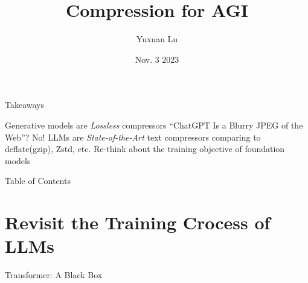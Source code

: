 \documentclass[scheme=plain]{ctexbeamer}
\title{Compression for AGI}
\author{Yuxuan Lu}
\institute{Northeastern Human-Centered AI Lab}
\date{Nov. 3 2023}
\begin{document}
\maketitle

\begin{frame}{Takeaways}
    \begin{outline}
        \1 Generative models are \emph{Lossless} compressors
            \2 ``ChatGPT Is a Blurry JPEG of the Web''? No!
        \1 LLMs are \emph{State-of-the-Art} text compressors
            \2 comparing to deflate(gzip), Zstd, etc.
        \1 Re-think about the training objective of foundation models
    \end{outline}
\end{frame}

\begin{frame}{Table of Contents}
    \tableofcontents
\end{frame}

\section{Revisit the Training Crocess of LLMs}
\begin{frame}{Transformer: A Black Box}
    
\end{frame}

\end{document}
